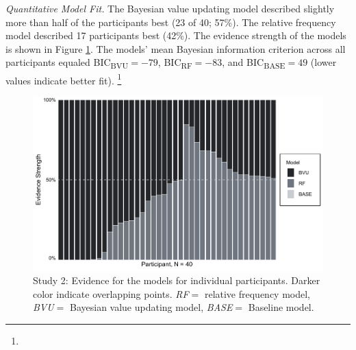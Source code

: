 \documentclass[
  a4paper, man, floatsintext]{apa6}
\begin{document}
\textit{Quantitative Model Fit.} The Bayesian value updating model
described slightly more than half of the participants best (23 of 40;
57\%). The relative frequency model described 17 participants best
(42\%). The evidence strength of the models is shown in Figure
\ref{fig:fig4}. The models' mean Bayesian information criterion across
all participants equaled BIC\textsubscript{BVU}\(= -79\),
BIC\textsubscript{RF}\(= -83\), and BIC\textsubscript{BASE}\(= 49\)
(lower values indicate better fit).
\footnote{}

\begin{figure}[htb]

{\centering \includegraphics[width=.9\linewidth]{../figures/fig4-1} 

}

\caption{Study 2: Evidence for the models for individual participants. Darker color indicate overlapping points. \textit{RF}$=$ relative frequency model, \textit{BVU}$=$ Bayesian value updating model, \textit{BASE}$=$ Baseline model.}\label{fig:fig4}
\end{figure}
\end{document}
